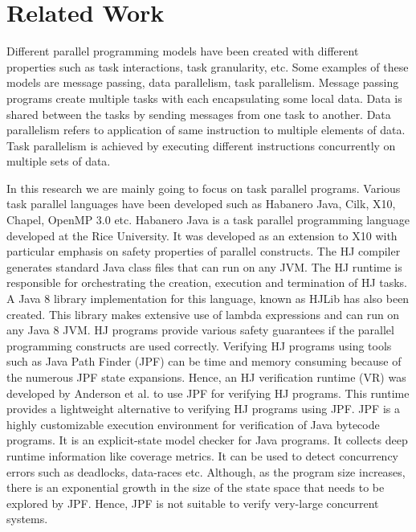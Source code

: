 \section{Related Work}

Different parallel programming models have been created with different properties such as task interactions, task granularity,  etc. Some examples of these models are message passing, data parallelism, task parallelism. Message passing \cite{Forum:1994:MMI:898758} programs create multiple tasks with each encapsulating some local data. Data is shared between the tasks by sending messages from one task to another. Data parallelism refers to application of same instruction to multiple elements of data. Task parallelism is achieved by executing different instructions concurrently on multiple sets of data.

In this research we are mainly going to focus on task parallel programs. Various task parallel languages have been developed such as Habanero Java, Cilk, X10, Chapel, OpenMP 3.0 etc. Habanero Java \cite{cave2011habanero} is a task parallel programming language developed at the Rice University. It was developed as an extension to X10 with particular emphasis on safety properties of parallel constructs. The HJ compiler generates standard Java class files that can run on any JVM. The HJ runtime is responsible for orchestrating the creation, execution and termination of HJ tasks. A Java 8 library implementation for this language, known as HJLib \cite{imam2014habanero} has also been created. This library makes extensive use of lambda expressions and can run on any Java 8 JVM. HJ programs provide various safety guarantees if the parallel programming constructs are used correctly. Verifying HJ programs using tools such as Java Path Finder (JPF) can be time and memory consuming because of the numerous JPF state expansions. Hence, an HJ verification runtime (VR) \cite{anderson2014jpf} was developed by Anderson et al. to use JPF for verifying HJ programs. This runtime provides a lightweight alternative to verifying HJ programs using JPF. JPF \cite{JPF} is a highly customizable execution environment for verification of Java bytecode programs. It is an explicit-state model checker for Java programs. It collects deep runtime information like coverage metrics. It can be used to detect concurrency errors such as deadlocks, data-races etc. Although, as the program size increases, there is an exponential growth in the size of the state space that needs to be explored by JPF. Hence, JPF is not suitable to verify very-large concurrent systems.

